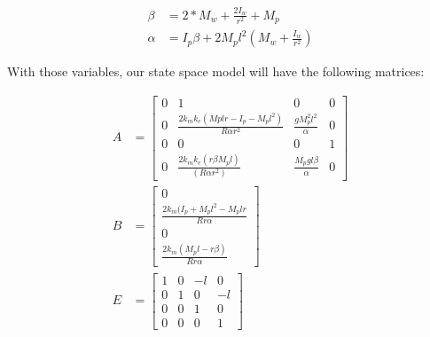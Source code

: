 \documentclass{article}
\begin{document}
\begin{align*}
    \beta &= 2*M_w + \frac{2I_w}{r^2} + M_p \\
    \alpha &= I_p\beta + 2M_pl^2(M_w+\frac{I_w}{r^2})
\end{align*}

With those variables, our state space model will have the following matrices:

\begin{align*}
    A &= 
    \begin{bmatrix}
        0 & 1 & 0 & 0 \\
        0 & \frac{2k_m k_e (Mp l r - I_p- M_p l^2)}{R \alpha r^2} & \frac{g M_p^2l^2}{\alpha} & 0\\
        0 & 0 & 0 & 1 \\
        0 & \frac{2k_m k_e(r \beta M_pl)}{(R \alpha r^2)} & \frac{M_p g l \beta}{\alpha} & 0 
    \end{bmatrix}\\
    B &= \begin{bmatrix}
        0 \\
        \frac{2k_m (I_p+M_p l^2 - M_p l r}{R r \alpha} \\
        0 \\
        \frac{2k_m (M_p l-r \beta )}{R r \alpha} 
    \end{bmatrix}\\
    E &= \begin{bmatrix}
        1 & 0 &-l &0 \\
        0 &1 &0 &-l\\
        0 &0 &1 &0 \\
        0 &0 &0 &1
    \end{bmatrix}
\end{align*}
\end{document}
